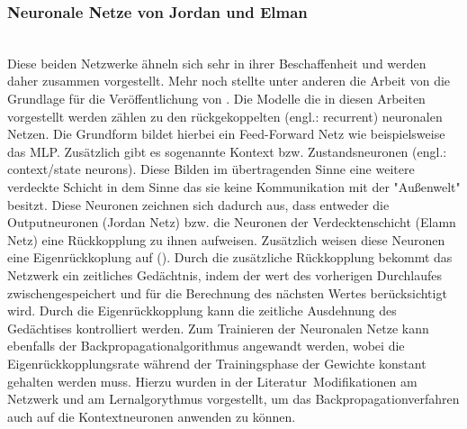 \subsubsection{Neuronale Netze von Jordan und Elman}\\
Diese beiden Netzwerke ähneln sich sehr in ihrer Beschaffenheit und werden daher zusammen vorgestellt. Mehr noch stellte unter anderen die Arbeit von \citet{Jordan1986} die Grundlage für die Veröffentlichung von \citet{Elman1990}. Die Modelle die in diesen Arbeiten vorgestellt werden zählen zu den rückgekoppelten (engl.: recurrent) neuronalen Netzen. Die Grundform bildet hierbei ein Feed-Forward Netz wie beispielsweise das MLP. Zusätzlich gibt es sogenannte Kontext bzw. Zustandsneuronen (engl.: context/state neurons). Diese Bilden im übertragenden Sinne eine weitere verdeckte Schicht in dem Sinne das sie keine Kommunikation mit der "Außenwelt" besitzt. Diese Neuronen zeichnen sich dadurch aus, dass entweder die Outputneuronen (Jordan Netz) bzw. die Neuronen der Verdecktenschicht (Elamn Netz) eine Rückkopplung zu ihnen aufweisen. Zusätzlich weisen diese Neuronen eine Eigenrückkoplung auf (). 
Durch die zusätzliche Rückkopplung bekommt das Netzwerk ein zeitliches Gedächtnis, indem der wert des vorherigen Durchlaufes zwischengespeichert und für die Berechnung des nächsten Wertes berücksichtigt wird. Durch die Eigenrückkopplung kann die zeitliche Ausdehnung des Gedächtises kontrolliert werden. Zum Trainieren der Neuronalen Netze kann ebenfalls der Backpropagationalgorithmus angewandt werden, wobei die Eigenrückkopplungsrate während der Trainingsphase der Gewichte konstant gehalten werden muss. Hierzu wurden in der Literatur\, Modifikationen am Netzwerk und am Lernalgorythmus vorgestellt, um das Backpropagationverfahren auch auf die Kontextneuronen anwenden zu können.


